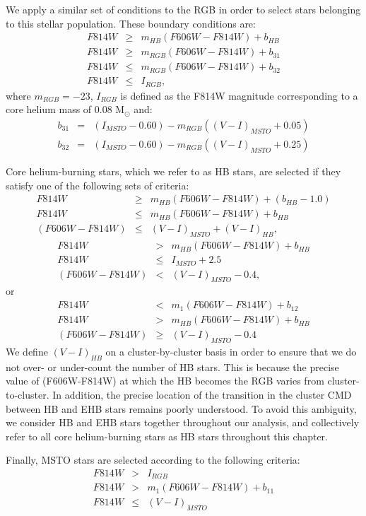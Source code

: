 We apply a similar set of conditions to the RGB in order to select
stars belonging to this stellar population.  These boundary conditions
are:
\begin{eqnarray}
\label{rgb_1}
F814W &\ge& m_{HB}(F606W-F814W) + b_{HB} \\
F814W &\ge& m_{RGB}(F606W-F814W) + b_{31} \\
F814W &\le& m_{RGB}(F606W-F814W) + b_{32} \\
F814W &\le& I_{RGB},
\end{eqnarray}
where $m_{RGB} = -23$, $I_{RGB}$ is defined as the F814W magnitude
corresponding to a core helium mass of 0.08 M$_{\odot}$ and:
\begin{eqnarray}
\label{b_31_and_b_32}
b_{31} &=& (I_{MSTO}-0.60)-m_{RGB}((V-I)_{MSTO}+0.05) \\
b_{32} &=& (I_{MSTO}-0.60)-m_{RGB}((V-I)_{MSTO}+0.25)
\end{eqnarray}

Core helium-burning stars, which we refer to as HB stars, are selected
if they satisfy one of the following sets of criteria:
\begin{eqnarray}
\label{hb1}
F814W &\ge& m_{HB}(F606W-F814W) + (b_{HB}-1.0) \\
F814W &\le& m_{HB}(F606W-F814W) + b_{HB} \\
(F606W-F814W) &\le& (V-I)_{MSTO} + (V-I)_{HB},
\end{eqnarray}
\begin{eqnarray}
\label{hb2}
F814W &>& m_{HB}(F606W-F814W) + b_{HB} \\
F814W &\le& I_{MSTO} + 2.5 \\
(F606W-F814W) &<& (V-I)_{MSTO} - 0.4,
\end{eqnarray}
or
\begin{eqnarray}
\label{hb3}
F814W &<& m_1(F606W-F814W) + b_{12} \\
F814W &>& m_{HB}(F606W-F814W) + b_{HB} \\
(F606W-F814W) &\ge& (V-I)_{MSTO} - 0.4
\end{eqnarray}
We define $(V-I)_{HB}$ on a cluster-by-cluster basis in order to
ensure that we do not over- or under-count the number of HB stars.
This is because the precise value of (F606W-F814W) at which the HB
becomes the RGB varies from cluster-to-cluster.  In addition, the
precise location of the transition in the cluster CMD between HB
and EHB stars remains poorly understood.  To avoid this ambiguity, we
consider HB and EHB stars
together throughout our analysis, and collectively refer to all core
helium-burning stars as HB stars throughout this chapter.

Finally, MSTO stars are selected according to the following criteria:
\begin{eqnarray}
\label{msto_1}
F814W &>& I_{RGB} \\
F814W &>& m_1(F606W-F814W) + b_{11} \\
F814W &\le& (V-I)_{MSTO}
\end{eqnarray}
